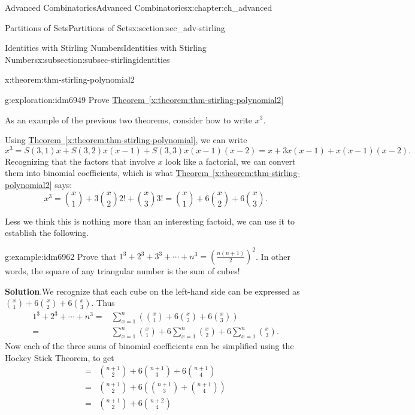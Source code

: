 \documentclass[oneside,10pt,]{book}
\numberwithin{equation}{chapter}
\newcommand{\amp}{&}
\begin{document}
\begin{chapterptx}{Advanced Combinatorics}{}{Advanced Combinatorics}{}{}{x:chapter:ch_advanced}
\begin{sectionptx}{Partitions of Sets}{}{Partitions of Sets}{}{}{x:section:sec_adv-stirling}
\begin{subsectionptx}{Identities with Stirling Numbers}{}{Identities with Stirling Numbers}{}{}{x:subsection:subsec-stirlingidentities}
\begin{theorem}{}{}{x:theorem:thm-stirling-polynomial2}
\end{theorem}
\begin{exploration}{}{g:exploration:idm6949}%
Prove \hyperref[x:theorem:thm-stirling-polynomial2]{Theorem~\ref{x:theorem:thm-stirling-polynomial2}}%
\end{exploration}
As an example of the previous two theorems, consider how to write \(x^3\).%
\par
Using \hyperref[x:theorem:thm-stirling-polynomial]{Theorem~\ref{x:theorem:thm-stirling-polynomial}}, we can write%
\begin{equation*}
x^3 = S(3,1)x + S(3,2)x(x-1) + S(3,3)x(x-1)(x-2) = x + 3x(x-1) + x(x-1)(x-2)\text{.}
\end{equation*}
Recognizing that the factors that involve \(x\) look like a factorial, we can convert them into binomial coefficients, which is what \hyperref[x:theorem:thm-stirling-polynomial2]{Theorem~\ref{x:theorem:thm-stirling-polynomial2}} says:%
\begin{equation*}
x^3 = \binom{x}{1} + 3\binom{x}{2}2! + \binom{x}{3}3! = \binom{x}{1} + 6\binom{x}{2} + 6 \binom{x}{3}.
\end{equation*}
%
\par
Less we think this is nothing more than an interesting factoid, we can use it to establish the following.%
\begin{example}{}{g:example:idm6962}%
Prove that \(1^3 + 2^3 + 3^3 + \cdots + n^3 = \left(\frac{n(n+1)}{2}\right)^2\).  In other words, the square of any triangular number is the sum of cubes!%
\par\smallskip%
\noindent\textbf{Solution}.\hypertarget{g:solution:idm6966}{}\quad{}We recognize that each cube on the left-hand side can be expressed as \(\binom{x}{1} + 6 \binom{x}{2} + 6\binom{x}{3}\).  Thus%
\begin{align*}
1^3 + 2^3 + \cdots + n^3 = \amp \sum_{x=1}^n \left(\binom{x}{1} + 6 \binom{x}{2} + 6\binom{x}{3}\right)\\
= \amp \sum_{x=1}^n \binom{x}{1} + 6 \sum_{x=1}^n \binom{x}{2} + 6 \sum_{x=1}^n \binom{x}{3}\text{.}
\end{align*}
Now each of the three sums of binomial coefficients can be simplified using the Hockey Stick Theorem, to get%
\begin{align*}
=  \amp \binom{n+1}{2} + 6 \binom{n+1}{3} + 6 \binom{n+1}{4} \\
= \amp \binom{n+1}{2} + 6\left(\binom{n+1}{3}+\binom{n+1}{4}\right) \\
= \amp \binom{n+1}{2} + 6\binom{n+2}{4} 

\end{align*}
\end{example}
\end{subsectionptx}
\end{sectionptx}
\end{chapterptx}
\end{document}
